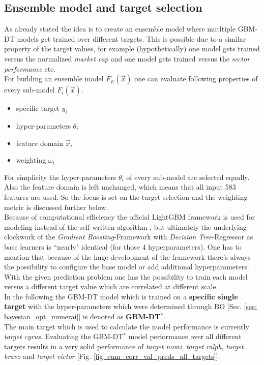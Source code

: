 \documentclass[12pt, a4paper]{article}
\begin{document}
\subsection{Ensemble model and target selection}
As already stated the idea is to create an ensemble model where mutltiple GBM-DT models get trained over different targets. This is possible due to a similar property of the target values, for example (hypothetically) one model gets trained versus the normalized \textit{market cap} and one model gets trained versus the \textit{sector performance} etc. \\
For building an ensemble model $F_E(\vec{x})$ one can evaluate following properties of every sub-model $F_i(\vec{x})$.
\begin{itemize}
    \item specific target $y_i$
    \item hyper-parameters $\theta_i$
    \item feature domain $\vec{x}_i$
    \item weighting $\omega_i$
\end{itemize}
For simplicity the hyper-parameters $\theta_i$ of every sub-model are selected equally. Also the feature domain is left unchanged, which means that all input 583 features are used. So the focus is set on the target selection and the weighting metric is discussed further below. \\
Because of computational efficiency the official LightGBM framework \cite{LightGBM} is used for modeling instead of the self written algorithm \cite{Gschaider}, but ultimately the underlying clockwork of the \textit{Gradient Boosting}-Framework with \textit{Decision Tree}-Regressor as base learners is ``nearly" identical (for those 4 hyperparameters). One has to mention that because of the huge development of the framework there's always the possibility to configure the base model or add additional hyperparameters. With the given prediction problem one has the possibility to train each model versus a different target value which are correlated at different scale. \\
In the following the GBM-DT model which is trained on a \textbf{specific single target} with the hyper-parameters which were determined through BO [Sec. \ref{sec: bayesian_opt_numerai}] is denoted as \textbf{GBM-DT$^{\ast}$}. \\
The main target which is used to calculate the model performance is currently \textit{target cyrus}. Evaluating the GBM-DT$^{\ast}$ model performance over all different targets results in a very solid performance of \textit{target nomi}, \textit{target ralph}, \textit{target bravo} and \textit{target victor} [Fig. \ref{fig: cum_corr_val_preds_all_targets}]. \\
\end{document}

